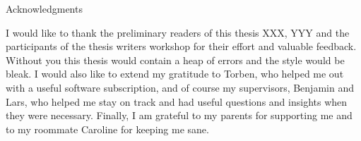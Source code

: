 \thispagestyle{empty}

\vspace*{20mm}

\begin{center}
{ Acknowledgments}
\end{center}

\vspace{10mm}


I would like to thank the preliminary readers of this thesis XXX, YYY and the participants of the thesis writers workshop for their effort and valuable feedback.
Without you this thesis would contain a heap of errors and the style would be bleak.
I would also like to extend my gratitude to Torben, who helped me out with a useful software subscription, and of course my supervisors, Benjamin and Lars, who helped me stay on track and had useful questions and insights when they were necessary.
Finally, I am grateful to my parents for supporting me and to my roommate Caroline for keeping me sane.

\cleardoublepage{}

